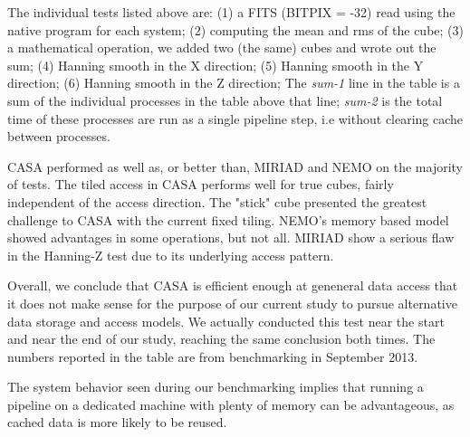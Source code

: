 \documentclass{article}
\begin{document}
The individual tests listed above are: 
(1) a FITS (BITPIX = -32) read using the native program for each system;
(2) computing the mean and rms of the cube;
(3) a mathematical operation, we added two (the same) cubes and wrote
out the sum;
(4) Hanning smooth in the X direction;
(5) Hanning smooth in the Y direction;
(6) Hanning smooth in the Z direction;
The {\it sum-1} line in the table is 
a sum of the individual processes in the table above that line; {\it sum-2} is  the total
time of these processes are run as a single pipeline step, i.e without clearing cache
between processes.

CASA performed as well as, or better than, MIRIAD
and NEMO on the majority of tests.
The tiled access in CASA performs well for true cubes, fairly
independent of the access direction. 
The "stick" cube presented the greatest challenge to CASA with
the current fixed tiling. NEMO's memory based model showed
advantages in some operations, but not all. MIRIAD show a serious
flaw in the Hanning-Z test due to its underlying access pattern.

Overall, we conclude that CASA is efficient enough at geneneral data 
access that
it does not make sense for the purpose of our current study to pursue
alternative data storage and access models. 
We actually conducted this
test near the start and near the end of our study, reaching the
same conclusion both times. The numbers reported in the table are from
benchmarking in September 2013.

The system behavior seen during our benchmarking
implies that running a pipeline on a dedicated machine
with plenty of memory can be advantageous, as cached data is more likely
to be reused. 
\end{document}
